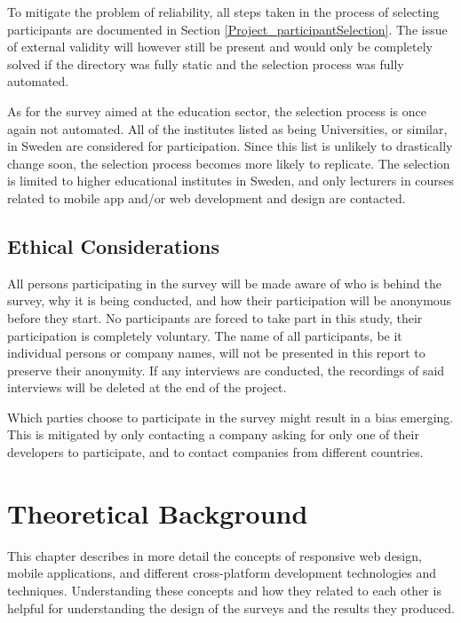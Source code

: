 \documentclass[a4paper,12pt]{article}
\begin{document}
To mitigate the problem of reliability, all steps taken in the process of selecting participants are documented in Section \ref{Project_participantSelection}. The issue of external validity will however still be present and would only be completely solved if the directory was fully static and the selection process was fully automated.

As for the survey aimed at the education sector, the selection process is once again not automated. All of the institutes listed as being Universities, or similar, in Sweden are considered for participation. Since this list is unlikely to drastically change soon, the selection process becomes more likely to replicate. The selection is limited to higher educational institutes in Sweden, and only lecturers in courses related to mobile app and/or web development and design are contacted.

\subsection{Ethical Considerations}
\label{Method_ethics}
All persons participating in the survey will be made aware of who is behind the survey, why it is being conducted, and how their participation will be anonymous before they start. No participants are forced to take part in this study, their participation is completely voluntary.
The name of all participants, be it individual persons or company names, will not be presented in this report to preserve their anonymity. If any interviews are conducted, the recordings of said interviews will be deleted at the end of the project.

Which parties choose to participate in the survey might result in a bias emerging. This is mitigated by only contacting a company asking for only one of their developers to participate, and to contact companies from different countries.
\newpage

\section{Theoretical Background}
\label{Theory}
This chapter describes in more detail the concepts of responsive web design, mobile applications, and different cross-platform development technologies and techniques. Understanding these concepts and how they related to each other is helpful for understanding the design of the surveys and the results they produced.
\end{document}
